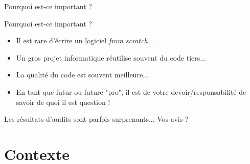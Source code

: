\documentclass{beamer}
\begin{document}
\begin{frame}[plain]%
%  
\end{frame}


\begin{frame}[plain]%
%  
\end{frame}

\begin{frame}[plain]%
%  
\end{frame}

\begin{frame}{Pourquoi est-ce important ?}
  \begin{alertblock}{Pourquoi est-ce important ?}
    \begin{itemize}
    \item Il est rare d'écrire un logiciel \emph{from scratch...}
    \item Un gros projet informatique réutilise souvent du code
      tiers...
    \item La qualité du code est souvent meilleure...
    \item En tant que futur ou future "pro", il est de votre
      devoir/responsabilité de savoir de quoi il est question !
    \end{itemize}


  \end{alertblock}

  Les résultats d'audits sont parfois surprenants... Vos avis ?

\end{frame}




\section{Contexte}
\end{document}
